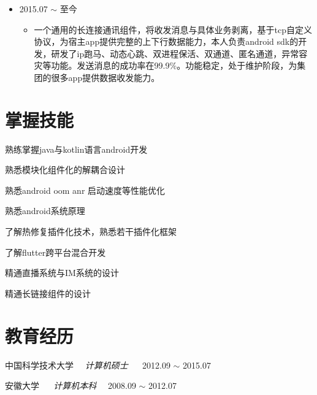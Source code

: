 \documentclass[line,margin,UTF8]{res}
\begin{document}
\begin{resume}
\begin{itemize}
\begin{itemize}

 \end{itemize}
 \end{itemize}
 
\begin{itemize}
\item {} 2015.07 $\sim$ 至今
	\vspace{-3pt}
	\begin{itemize}
		\item 
		一个通用的长连接通讯组件，将收发消息与具体业务剥离，基于tcp自定义协议，为宿主app提供完整的上下行数据能力，本人负责android sdk的开发，研发了ip跑马、动态心跳、双进程保活、双通道、匿名通道，异常容灾等功能。发送消息的成功率在99.9\%。功能稳定，处于维护阶段，为集团的很多app提供数据收发能力。
\end{itemize}
\end{itemize}

\section{掌握技能}
熟练掌握java与kotlin语言android开发

熟悉模块化组件化的解耦合设计

熟悉android oom anr 启动速度等性能优化

熟悉android系统原理

了解热修复插件化技术，熟悉若干插件化框架

了解flutter跨平台混合开发

精通直播系统与IM系统的设计

精通长链接组件的设计

\section{教育经历}
中国科学技术大学  ~~{\sl 计算机硕士} ~~ 2012.09 $\sim$ 2015.07

安徽大学 ~~ {\sl 计算机本科} ~~2008.09 $\sim$ 2012.07


\end{resume}
\end{document}

